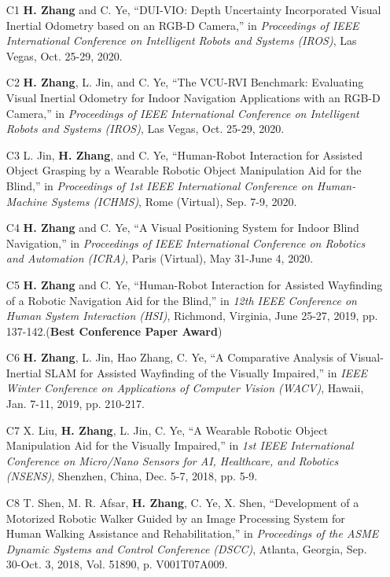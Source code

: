 \begin{justify}
	\begin{itemize}[before=\fontsize{9pt}{1em}\bodyfontlight\upshape\color{text},leftmargin=3ex, nosep, noitemsep]
		\setlength{\parskip}{0pt}
		\renewcommand{\labelitemi}{\bullet}
		\item[C1]{\textbf{H. Zhang} and C. Ye, “DUI-VIO: Depth Uncertainty Incorporated Visual Inertial Odometry based on an RGB-D Camera,” in \emph{Proceedings of IEEE International Conference on Intelligent Robots and Systems (IROS)}, Las Vegas, Oct. 25-29, 2020.}
		\item[C2]{\textbf{H. Zhang}, L. Jin, and C. Ye, “The VCU-RVI Benchmark: Evaluating Visual Inertial Odometry for Indoor Navigation Applications with an RGB-D Camera,” in \emph{Proceedings of IEEE International Conference on Intelligent Robots and Systems (IROS)}, Las Vegas, Oct. 25-29, 2020.}	
		\item[C3]{L. Jin, \textbf{H. Zhang}, and C. Ye, “Human-Robot Interaction for Assisted Object Grasping by a Wearable Robotic Object Manipulation Aid for the Blind,” in \emph{Proceedings of 1st IEEE International Conference on Human-Machine Systems (ICHMS)}, Rome (Virtual), Sep. 7-9, 2020. }
		\item[C4]{\textbf{H. Zhang} and C. Ye, “A Visual Positioning System for Indoor Blind Navigation,” in \emph{Proceedings of IEEE International Conference on Robotics and Automation (ICRA)}, Paris (Virtual), May 31-June 4, 2020.}
		\item[C5]{\textbf{H. Zhang} and C. Ye, “Human-Robot Interaction for Assisted Wayfinding of a Robotic Navigation Aid for the Blind,” in \emph{12th IEEE Conference on Human System Interaction (HSI)}, Richmond, Virginia, June 25-27, 2019, pp. 137-142.(\textbf{Best Conference Paper Award})}
		\item[C6]{\textbf{H. Zhang}, L. Jin, Hao Zhang, C. Ye, “A Comparative Analysis of Visual-Inertial SLAM for Assisted Wayfinding of the Visually Impaired,” in \emph{IEEE Winter Conference on Applications of Computer Vision (WACV)}, Hawaii, Jan. 7-11, 2019, pp. 210-217.}
		\item[C7]{X. Liu, \textbf{H. Zhang}, L. Jin, C. Ye,  “A Wearable Robotic Object Manipulation Aid for the Visually Impaired,” in \emph{1st IEEE International Conference on Micro/Nano Sensors for AI, Healthcare, and Robotics (NSENS)}, Shenzhen, China, Dec. 5-7, 2018, pp. 5-9.}
		\item[C8]{T. Shen, M. R. Afsar, \textbf{H. Zhang}, C. Ye, X. Shen, “Development of a Motorized Robotic Walker Guided by an Image Processing System for Human Walking Assistance and Rehabilitation,” in \emph{Proceedings of the ASME Dynamic Systems and Control Conference (DSCC)}, Atlanta, Georgia, Sep. 30-Oct. 3, 2018, Vol. 51890, p. V001T07A009.}

\end{itemize}
\end{justify}
